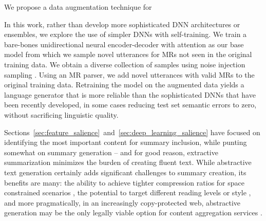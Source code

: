 









We propose a data augmentation technique for 



In this work, rather than develop more sophisticated DNN architectures
or ensembles,
we explore the use of  simpler DNNs  with self-training.
We train a bare-bones unidirectional neural encoder-decoder with attention
\cite{bahdanau2014neural}
as our base model from which we sample novel utterances for MRs
not seen in the original training data. 
We obtain a diverse collection of samples using noise injection sampling 
\cite{cho2016noisy}.
Using an MR parser, we add novel utterances with valid MRs to the original
training data.
Retraining the model on the augmented data yields a language generator
that is more reliable than the sophisticated DNNs that have been recently
developed, in some cases reducing test set semantic errors to zero, without
sacrificing linguistic quality. 










\pagebreak

Sections~\ref{sec:feature_salience}~and~\ref{sec:deep_learning_salience}
have focused on identifying the most important content for summary inclusion,
while punting somewhat on summary generation -- and for good reason, 
extractive summarization minimizes the burden of creating fluent text. 
While abstractive text generation certainly adds significant challenges to 
summary creation, 
its benefits are many: the ability to achieve tighter compression ratios
for space constrained scenarios \cite{fan2017controllable}, the potential
to target different reading levels \cite{margarido2008automatic}
or style \cite{shen2017style}, and more pragmatically, in
an increasingly copy-protected web, abstractive generation may be the only 
legally viable option for content aggregation services 
\cite{kassam2014google}.

